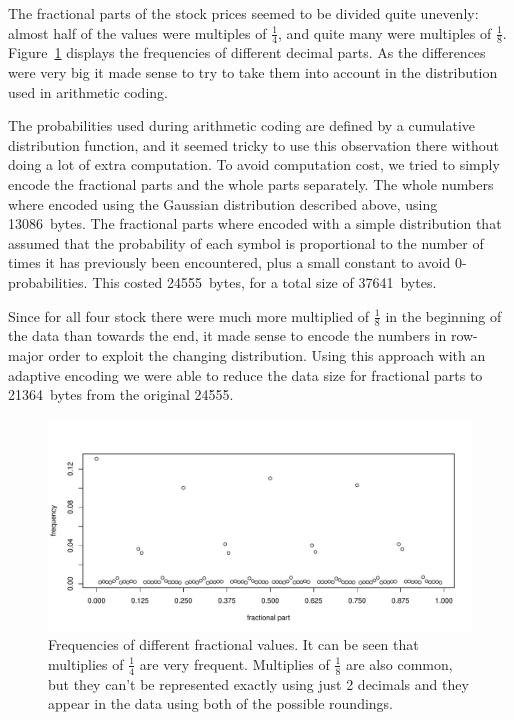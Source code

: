 \documentclass{article}
\begin{document}
The fractional parts of the stock prices seemed to be divided quite unevenly: almost half of the values were multiples of $\frac{1}{4}$, and quite many were multiples of $\frac{1}{8}$.
Figure~\ref{fig:frac} displays the frequencies of different decimal parts.
As the differences were very big it made sense to try to take them into account in the distribution used in arithmetic coding.

The probabilities used during arithmetic coding are defined by a cumulative distribution function, and it seemed tricky to use this observation there without doing a lot of extra computation.
To avoid computation cost, we tried to simply encode the fractional parts and the whole parts separately.
The whole numbers where encoded using the Gaussian distribution described above, using 13086~bytes.
The fractional parts where encoded with a simple distribution that assumed that the probability of each symbol is proportional to the number of times it has previously been encountered, plus a small constant to avoid 0-probabilities.
This costed 24555~bytes, for a total size of 37641~bytes.

Since for all four stock there were much more multiplied of $\frac{1}{8}$ in the beginning of the data than towards the end, it made sense to encode the numbers in row-major order to exploit the changing distribution.
Using this approach with an adaptive encoding we were able to reduce the data size for fractional parts to 21364~bytes from the original 24555.

\begin{figure}
	\includegraphics[scale=0.5]{frac.pdf}
	\caption{Frequencies of different fractional values. It can be seen that multiplies of $\frac{1}{4}$ are very frequent. Multiplies of $\frac{1}{8}$ are also common, but they can't be represented exactly using just 2 decimals and they appear in the data using both of the possible roundings.}
	\label{fig:frac}
\end{figure}
\end{document}
